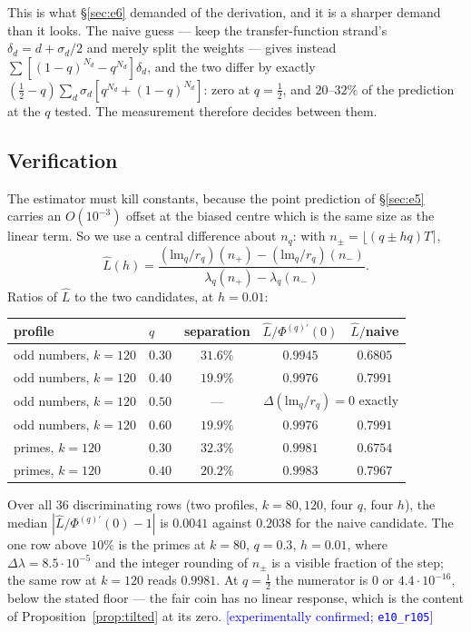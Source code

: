 \documentclass[11pt,a4paper]{article}
\theoremstyle{plain}
\theoremstyle{definition}
\theoremstyle{remark}
\newcommand{\lm}{\mathrm{lm}}
\newcommand{\STATUS}[1]{\textcolor{blue}{\textsf{[#1]}}}
\begin{document}
This is what \S\ref{sec:e6} demanded of the derivation, and it is a sharper demand than it
looks. The naive guess --- keep the transfer-function strand's $\delta_d=d+\sigma_d/2$ and merely split the
weights --- gives instead $\sum[(1-q)^{N_d}-q^{N_d}]\delta_d$, and the two differ by exactly
$(\tfrac12-q)\sum_d\sigma_d[q^{N_d}+(1-q)^{N_d}]$: zero at $q=\tfrac12$, and $20$--$32\%$ of
the prediction at the $q$ tested. The measurement therefore decides between them.

\subsection{Verification}\label{sec:e10}

The estimator must kill constants, because the point prediction of \S\ref{sec:e5} carries an
$O(10^{-3})$ offset at the biased centre which is the same size as the linear term. So we use
a central difference about $n_q$: with $n_\pm=\lfloor(q\pm hq)T\rceil$,
\[
  \widehat{L}(h)=\frac{(\lm_q/r_q)(n_+)-(\lm_q/r_q)(n_-)}
                      {\lambda_q(n_+)-\lambda_q(n_-)} .
\]
Ratios of $\widehat{L}$ to the two candidates, at $h=0.01$:

\begin{center}
\begin{tabular}{llccc}
\toprule
profile & $q$ & separation & $\widehat L/\Phi^{(q)\prime}(0)$ & $\widehat L/$naive\\
\midrule
odd numbers, $k=120$ & $0.30$ & $31.6\%$ & $\mathbf{0.9945}$ & $0.6805$\\
odd numbers, $k=120$ & $0.40$ & $19.9\%$ & $\mathbf{0.9976}$ & $0.7991$\\
odd numbers, $k=120$ & $0.50$ & --- & \multicolumn{2}{c}{$\Delta(\lm_q/r_q)=0$ exactly}\\
odd numbers, $k=120$ & $0.60$ & $19.9\%$ & $\mathbf{0.9976}$ & $0.7991$\\
primes, $k=120$ & $0.30$ & $32.3\%$ & $\mathbf{0.9981}$ & $0.6754$\\
primes, $k=120$ & $0.40$ & $20.2\%$ & $\mathbf{0.9983}$ & $0.7967$\\
\bottomrule
\end{tabular}
\end{center}

\noindent
Over all $36$ discriminating rows (two profiles, $k=80,120$, four $q$, four $h$), the median
$|\widehat L/\Phi^{(q)\prime}(0)-1|$ is $0.0041$ against $0.2038$ for the naive candidate. The
one row above $10\%$ is the primes at $k=80$, $q=0.3$, $h=0.01$, where $\Delta\lambda=8.5\cdot
10^{-5}$ and the integer rounding of $n_\pm$ is a visible fraction of the step; the same row
at $k=120$ reads $0.9981$. At $q=\tfrac12$ the numerator is $0$ or $4.4\cdot10^{-16}$, below
the stated floor --- the fair coin has no linear response, which is the content of
Proposition~\ref{prop:tilted} at its zero. \STATUS{experimentally confirmed; \texttt{e10\_r105}}
\end{document}

